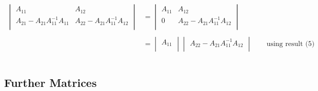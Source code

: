 \documentclass[11pt,a4paper]{article}
\theoremstyle{definition}
\begin{document}
\begin{enumerate}
\begin{align*}
\begin{vmatrix}
A_{11} & A_{12}\\
A_{21}-A_{21}A_{11}^{-1}A_{11} & A_{22}-A_{21}A^{-1}_{11}A_{12}\\
\end{vmatrix} & =
\begin{vmatrix}
A_{11} & A_{12}\\
0 & A_{22} - A_{21}A_{11}^{-1}A_{12}\\
\end{vmatrix}\\\\
& = \begin{vmatrix}
A_{11}\\
\end{vmatrix}\begin{vmatrix}
A_{22} -A_{21}A_{11}^{-1}A_{12}\\
\end{vmatrix}\qquad\text{using result (5)}\\\\
\end{align*}
\end{enumerate}


\pagebreak




\subsection{Further Matrices}
\end{document}
